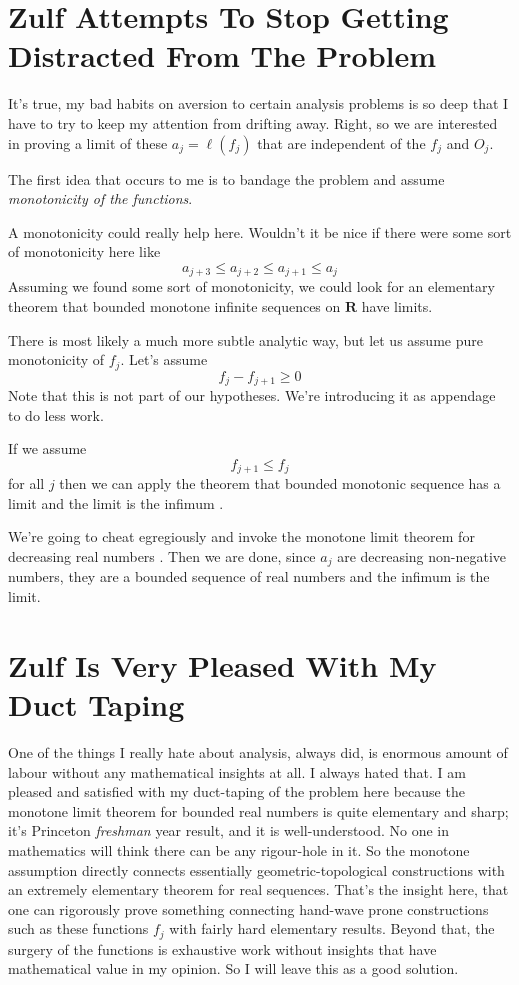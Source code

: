 \documentclass{amsart}
\begin{document}
\section{Zulf Attempts To Stop Getting Distracted From The Problem}

It's true, my bad habits on aversion to certain analysis problems is so deep that I have to try to keep my attention from drifting away.  Right, so we are interested in proving a limit of these $a_j = \ell(f_j)$ that are independent of the $f_j$ and $O_j$.

The first idea that occurs to me is to bandage the problem and assume {\em monotonicity of the functions}. 

A monotonicity could really help here.  Wouldn't it be nice if there were some sort of monotonicity here like
\[
a_{j+3} \le a_{j+2} \le a_{j+1} \le a_j 
\]
Assuming we found some sort of monotonicity, we could look for an elementary theorem that bounded monotone infinite sequences on $\mathbf{R}$ have limits.  

There is most likely a much more subtle analytic way, but let us assume pure monotonicity of $f_j$.  Let's assume
\[
f_j - f_{j+1} \ge 0
\]
Note that this is not part of our hypotheses.  We're introducing it as appendage to do less work.
 

If we assume
\[
f_{j+1} \le f_j
\]
for all $j$ then we can apply the theorem that bounded monotonic sequence has a limit and the limit is the infimum \cite{MR}.


We're going to cheat egregiously and invoke the monotone limit theorem for decreasing real numbers \cite{MR}.  Then we are done, since $a_j$ are decreasing non-negative numbers, they are a bounded sequence of real numbers and the infimum is the limit.

\section{Zulf Is Very Pleased With My Duct Taping}

One of the things I really hate about analysis, always did, is enormous amount of labour without any mathematical insights at all.  I always hated that.  I am pleased and satisfied with my duct-taping of the problem here because the monotone limit theorem for bounded real numbers is quite elementary and sharp; it's Princeton {\em freshman} year result, and it is well-understood.  No one in mathematics will think there can be any rigour-hole in it.  So the monotone assumption directly connects essentially geometric-topological constructions with an extremely elementary theorem for real sequences.  That's the insight here, that one can rigorously prove something connecting hand-wave prone constructions such as these functions $f_j$ with fairly hard elementary results.  Beyond that, the surgery of the functions is exhaustive work without insights that have mathematical value in my opinion.  So I will leave this as a good solution.


\begin{thebibliography}{CCCC}
\end{thebibliography}
\end{document}
